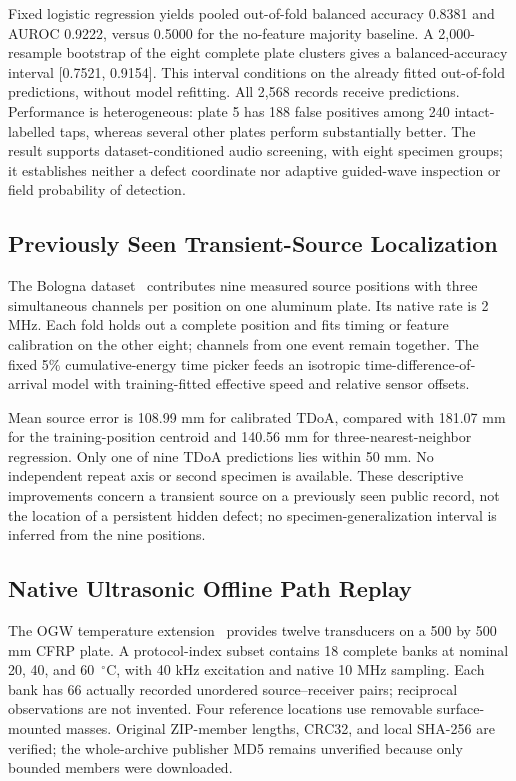Fixed logistic regression yields pooled out-of-fold balanced accuracy 0.8381
and AUROC 0.9222, versus 0.5000 for the no-feature majority baseline.
A 2,000-resample bootstrap of the eight complete plate clusters gives a
balanced-accuracy interval [0.7521, 0.9154]. This interval conditions on the
already fitted out-of-fold predictions, without model refitting. All 2,568
records receive predictions. Performance is heterogeneous: plate 5 has 188
false positives among 240 intact-labelled taps, whereas several other plates
perform substantially better. The result supports dataset-conditioned audio
screening, with eight specimen groups; it establishes neither a defect
coordinate nor adaptive guided-wave inspection or field probability of detection.

\subsection{Previously Seen Transient-Source Localization}
The Bologna dataset~\cite{zonzini2024dataset} contributes nine measured source
positions with three simultaneous channels per position on one aluminum plate.
Its native rate is 2 MHz. Each fold holds out a complete position and fits
timing or feature calibration on the other eight; channels from one event
remain together. The fixed 5\% cumulative-energy time picker feeds an isotropic
time-difference-of-arrival model with training-fitted effective speed and
relative sensor offsets.

Mean source error is 108.99 mm for calibrated TDoA, compared with 181.07 mm for
the training-position centroid and 140.56 mm for three-nearest-neighbor
regression. Only one of nine TDoA predictions lies within 50 mm. No independent
repeat axis or second specimen is available. These descriptive improvements
concern a transient source on a previously seen public record, not the
location of a persistent hidden defect; no specimen-generalization interval
is inferred from the nine positions.

\subsection{Native Ultrasonic Offline Path Replay}
The OGW temperature extension~\cite{moll2019temperature,moll2019temperaturedata}
provides twelve transducers on a 500 by 500 mm CFRP plate. A protocol-index
subset contains 18 complete banks at nominal 20, 40, and 60~$^{\circ}$C, with
40 kHz excitation and native 10 MHz sampling. Each bank has 66 actually
recorded unordered source--receiver pairs; reciprocal observations are not
invented. Four reference locations use removable surface-mounted masses.
Original ZIP-member lengths, CRC32, and local SHA-256 are verified; the
whole-archive publisher MD5 remains unverified because only bounded members
were downloaded.

